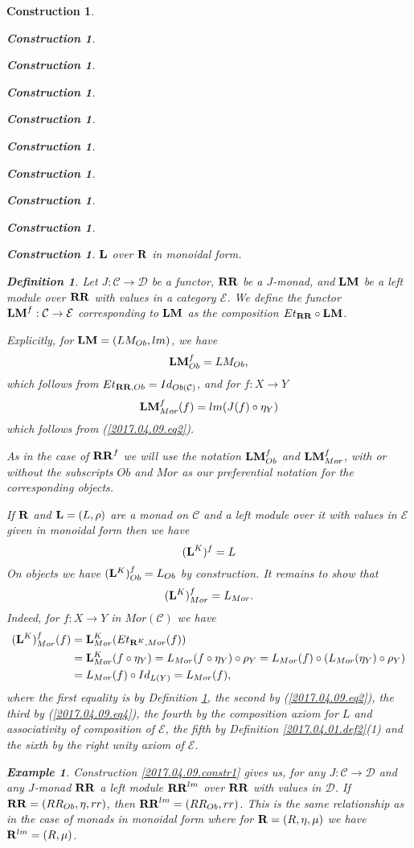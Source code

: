 \documentclass[12pt]{amsart}
\newtheorem{definition}[proposition]{Definition}
\newtheorem{example}[proposition]{Example}
\numberwithin{proposition}{subsection}
\newtheorem{construction}[proposition]{Construction}
\newcommand{\llabel}[1]{\label{#1}}
\newcommand{\sr}{\rightarrow}
\newcommand{\R}{{\bf R}}
\newcommand{\RR}{{\bf RR}}
\newcommand{\LM}{{\bf LM}}
\newcommand{\C}{{\mathcal C}}
\newcommand{\D}{{\mathcal D}}
\newcommand{\E}{{\mathcal E}}
\begin{document}
\begin{construction}
\begin{construction}
\begin{construction}
\begin{construction}
\begin{construction}
\begin{construction}
\begin{construction}
\begin{construction}
\begin{construction}
\begin{construction}
${\bf L}$ over $\R$ in monoidal form.
%
\begin{definition}
\llabel{2017.04.05.def1} 
Let $J:\C\sr\D$ be a functor, $\RR$ be a $J$-monad, and
$\LM$ be a left module over $\RR$ with values in a category $\E$. We define the
functor $\LM^f:\C\sr \E$ corresponding to $\LM$ as the composition
$Et_{\RR}\circ \LM$.
\end{definition}
%
Explicitly, for $\LM=(LM_{Ob},lm)$, we have
%
$$\LM^f_{Ob}=LM_{Ob},$$
%
which follows from $Et_{\RR,Ob}=Id_{Ob(\C)}$, and for $f:X\sr Y$ 
%
\begin{equation}\llabel{2017.04.11.eq5}
\LM^f_{Mor}(f)=lm(J(f)\circ \eta_{Y})
\end{equation}%
%
which follows from (\ref{2017.04.09.eq2}). 

As in the case of $\RR^f$ we will use the notation $\LM^f_{Ob}$ and
$\LM^f_{Mor}$, with or without the subscripts $Ob$ and $Mor$ as our
preferential notation for the corresponding objects.

If $\R$ and ${\bf L}=(L,\rho)$ are a monad on $\C$ and a left module over it
with values in $\E$ given in monoidal form then we have
%
\begin{equation}
\llabel{2017.04.17.eq4}
({\bf L}^K)^f=L
\end{equation}%
%
On objects we have $({\bf L}^K)^f_{Ob}=L_{Ob}$ by construction. It remains to
show that
%
\begin{equation}\llabel{2017.04.09.eq1}
({\bf L}^K)^f_{Mor}=L_{Mor}.
\end{equation}%
%
Indeed, for $f:X\sr Y$ in $Mor(\C)$ we have
%
\begin{equation*}
  \begin{split}
    ({\bf L}^K)^f_{Mor}(f) &= {\bf L}^K_{Mor}(Et_{\R^K,Mor}(f))
    \\
    &= {\bf L}^K_{Mor}(f\circ \eta_Y)=L_{Mor}(f\circ \eta_Y)\circ \rho_Y=L_{Mor}(f)\circ (L_{Mor}(\eta_Y)\circ \rho_Y)
    \\
    &= L_{Mor}(f)\circ Id_{L(Y)}=L_{Mor}(f),
  \end{split}
\end{equation*}
%
where the first equality is by Definition \ref{2017.04.05.def1}, the second by
(\ref{2017.04.09.eq2}), the third by (\ref{2017.04.09.eq4}), the fourth by the
composition axiom for $L$ and associativity of composition of $\E$, the fifth
by Definition \ref{2017.04.01.def2}(1) and the sixth by the right unity axiom
of $\E$.
%
\begin{example}\rm
\llabel{2017.04.15.ex2}
Construction \ref{2017.04.09.constr1} gives us, for any $J:\C\sr \D$ and any
$J$-monad $\RR$ a left module $\RR^{lm}$ over $\RR$ with values in $\D$.  If
$\RR=(RR_{Ob},\eta,rr)$, then $\RR^{lm}=(RR_{Ob},rr)$. This is the same
relationship as in the case of monads in monoidal form where for
$\R=(R,\eta,\mu)$ we have $\R^{lm}=(R,\mu)$.


\end{example}
\end{construction}
\end{construction}
\end{construction}
\end{construction}
\end{construction}
\end{construction}
\end{construction}
\end{construction}
\end{construction}
\end{construction}
\end{document}

